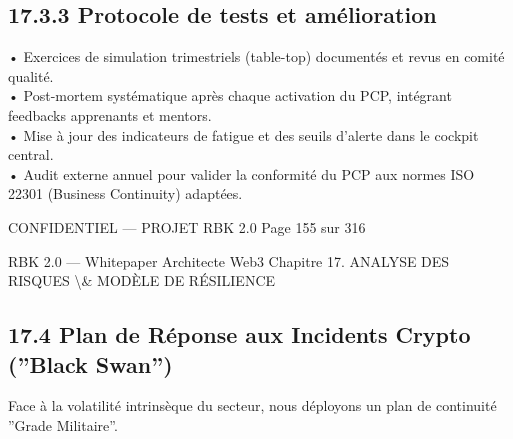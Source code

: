 \subsection{17.3.3 Protocole de tests et amélioration}
• Exercices de simulation trimestriels (table-top) documentés et revus en comité qualité.\\
\vspace{0.5em}
• Post-mortem systématique après chaque activation du PCP, intégrant feedbacks apprenants et mentors.\\
\vspace{0.5em}
• Mise à jour des indicateurs de fatigue et des seuils d’alerte dans le cockpit central.\\
\vspace{0.5em}
• Audit externe annuel pour valider la conformité du PCP aux normes ISO 22301 (Business Continuity) adaptées.\\
\vspace{0.5em}
\vspace{0.5em}
\begin{confidential}CONFIDENTIEL — PROJET RBK 2.0                                  Page 155 sur 316\end{confidential}
RBK 2.0 — Whitepaper Architecte Web3                                         Chapitre 17. ANALYSE DES RISQUES \textbackslash{}& MODÈLE DE RÉSILIENCE\\
\vspace{0.5em}
\vspace{0.5em}
\vspace{0.5em}
\subsection{17.4 Plan de Réponse aux Incidents Crypto (”Black Swan”)}
Face à la volatilité intrinsèque du secteur, nous déployons un plan de continuité ”Grade Militaire”.\\
\vspace{0.5em}
\vspace{0.5em}
